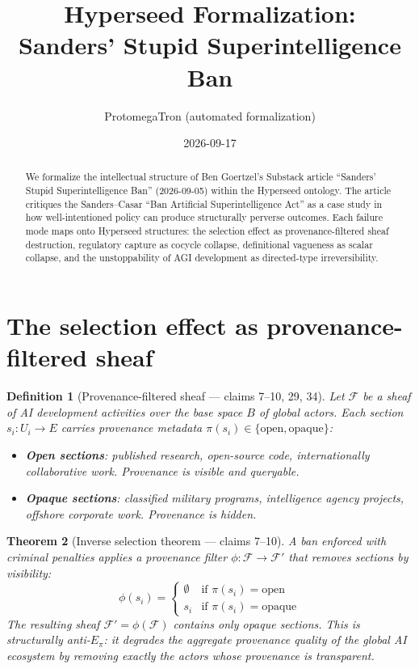 \documentclass[11pt,a4paper]{article}
\title{Hyperseed Formalization:\\
  Sanders' Stupid Superintelligence Ban}
\author{ProtomegaTron (automated formalization)}
\date{2026-09-17}
\newtheorem{definition}{Definition}[section]
\newtheorem{theorem}[definition]{Theorem}
\begin{document}
\maketitle

\begin{abstract}
We formalize the intellectual structure of Ben Goertzel's Substack article
``Sanders' Stupid Superintelligence Ban'' (2026-09-05) within the Hyperseed
ontology. The article critiques the Sanders--Casar ``Ban Artificial
Superintelligence Act'' as a case study in how well-intentioned policy
can produce structurally perverse outcomes. Each failure mode maps onto
Hyperseed structures: the selection effect as provenance-filtered sheaf
destruction, regulatory capture as cocycle collapse, definitional vagueness
as scalar collapse, and the unstoppability of AGI development as directed-type
irreversibility.
\end{abstract}

\tableofcontents

\section{The selection effect as provenance-filtered sheaf}
\label{sec:selection}

\begin{definition}[Provenance-filtered sheaf --- claims 7--10, 29, 34]
\label{def:prov-filter}
Let $\mathcal{F}$ be a sheaf of AI development activities over the base
space $B$ of global actors. Each section $s_i : U_i \to E$ carries
provenance metadata $\pi(s_i) \in \{\text{open}, \text{opaque}\}$:
\begin{itemize}
\item \textbf{Open sections}: published research, open-source code,
  internationally collaborative work. Provenance is visible and queryable.
\item \textbf{Opaque sections}: classified military programs, intelligence
  agency projects, offshore corporate work. Provenance is hidden.
\end{itemize}
\end{definition}

\begin{theorem}[Inverse selection theorem --- claims 7--10]
\label{thm:inverse-sel}
A ban enforced with criminal penalties applies a \emph{provenance filter}
$\phi : \mathcal{F} \to \mathcal{F}'$ that removes sections by visibility:
\[
  \phi(s_i) = \begin{cases}
    \emptyset & \text{if } \pi(s_i) = \text{open} \\
    s_i & \text{if } \pi(s_i) = \text{opaque}
  \end{cases}
\]
The resulting sheaf $\mathcal{F}' = \phi(\mathcal{F})$ contains only
opaque sections. This is structurally anti-$E_\pi$: it degrades the
aggregate provenance quality of the global AI ecosystem by removing
exactly the actors whose provenance is transparent.
\end{theorem}
\end{document}
